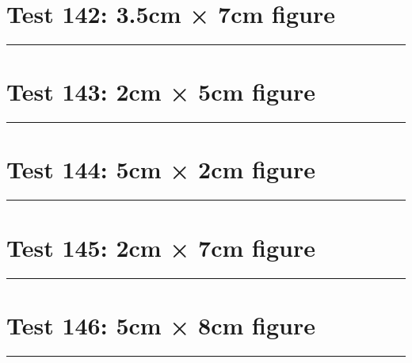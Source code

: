 \documentclass[a4paper,11pt]{article}
\begin{document}
\section*{Test 142: 3.5cm × 7cm figure}
\begin{swarmwrap}%
  \begin{minipage}[t]{3cm}
    \centering
    \rule{\linewidth}{7cm}
  \end{minipage}%
\end{swarmwrap}%
\swarmwrapnext
\lipsum[108]
\lipsum[109]
\lipsum[110]
\lipsum[111]
\lipsum[112]
\lipsum[113]
\section*{Test 143: 2cm × 5cm figure}
\begin{swarmwrap}%
  \begin{minipage}[t]{2cm}
    \centering
    \rule{\linewidth}{5cm}
  \end{minipage}%
\end{swarmwrap}%
\swarmwrapnext
\lipsum[101]
\lipsum[102]
\lipsum[103]
\lipsum[104]
\lipsum[105]
\lipsum[106]
\section*{Test 144: 5cm × 2cm figure}
\begin{swarmwrap}%
  \begin{minipage}[t]{5cm}
    \centering
    \rule{\linewidth}{2cm}
  \end{minipage}%
\end{swarmwrap}%
\swarmwrapnext
\lipsum[124]
\lipsum[125]
\lipsum[126]
\lipsum[127]
\lipsum[128]
\lipsum[129]
\section*{Test 145: 2cm × 7cm figure}
\begin{swarmwrap}%
  \begin{minipage}[t]{2cm}
    \centering
    \rule{\linewidth}{7cm}
  \end{minipage}%
\end{swarmwrap}%
\swarmwrapnext
\lipsum[101]
\lipsum[102]
\lipsum[103]
\lipsum[104]
\lipsum[105]
\section*{Test 146: 5cm × 8cm figure}
\begin{swarmwrap}%
  \begin{minipage}[t]{5cm}
    \centering
    \rule{\linewidth}{8cm}
  \end{minipage}%
\end{swarmwrap}%
\swarmwrapnext
\lipsum[126]
\lipsum[127]
\lipsum[128]
\lipsum[129]
\end{document}
